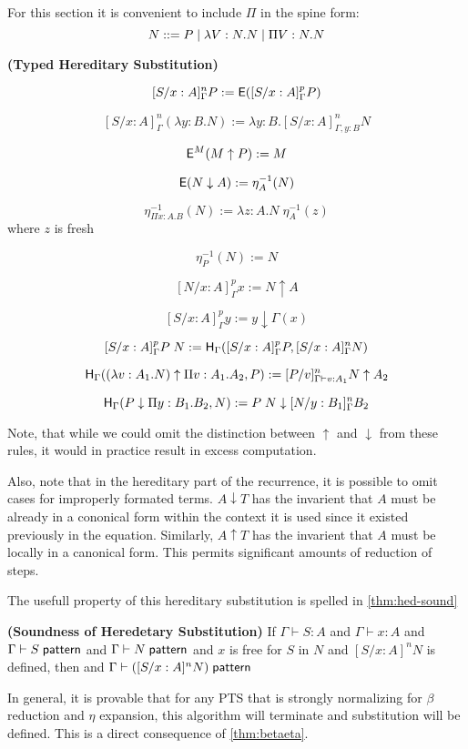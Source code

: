 For this section it is convenient to include $\Pi$ in the spine form: 
\[
N ::= P 
\; | \; \lambda V : N . N 
\; | \; \Pi V : N . N 
\]


\begin{definition}
\textbf{(Typed Hereditary Substitution)}

\[
[S / x : A]^n_{\Gamma } P := \mathsf{E}([S / x : A]^p_{\Gamma } P)
\]

\[
[S / x : A]^n_{\Gamma } (\lambda y : B . N) := \lambda y:B . [S / x : A]^n_{\Gamma, y : B} N
\]

\[
\mathsf{E}^M(M \uparrow P) := M
\]

\[
\mathsf{E}(N \downarrow A) := \eta^{-1}_A (N)
\]

\[
\eta^{-1}_{\Pi x : A . B}(N) := \lambda z : A . N \; \eta^{-1}_A(z)
\] where $z$ is fresh

\[
\eta^{-1}_{P}(N) := N
\]

\[ 
[ N / x : A]^p_{\Gamma} x := N \uparrow A
\]

\[
[S / x : A]^p_{\Gamma} y := y \downarrow \Gamma(x)
\] 

\[
[S / x : A]^p_{\Gamma } P\;N := 
\mathsf{H}_{\Gamma} ( [S/x : A]^p_{\Gamma} P , [S/x : A]^n_{\Gamma} N) 
\]

\[
\mathsf{H}_{\Gamma} ((\lambda v : A_1 . N) \uparrow \Pi v : A_1 . A_2 , P) 
:= [P/v]^n_{\Gamma \vdash v : A_1} N \uparrow A_2
\]

\[
\mathsf{H}_{\Gamma}(P \downarrow \Pi y : B_1 . B_2 , N) := P\; N \downarrow [N/y : B_1]^n_{\Gamma}B_2
\]

\label{def:tyhered}
\end{definition} 

Note, that while we could omit the distinction between $\uparrow$ and $\downarrow$ from
these rules, it would in practice result in excess computation.

Also, note that in the hereditary part of the recurrence, 
it is possible to omit cases for improperly formated terms.  $A \downarrow T$ has the invarient that
$A$ must be already in a cononical form within the context it is used since it existed previously in the
equation.  Similarly, $A \uparrow T$ has the invarient that $A$ must be locally in a canonical form.
This permits significant amounts of reduction of steps.

The usefull property of this hereditary substitution is spelled in \ref{thm:hed-sound}

\begin{theorem}
\textbf{(Soundness of Heredetary Substitution)}
If  $\Gamma \vdash S : A$ 
and $\Gamma \vdash x : A$ 
and $\Gamma \vdash S \; \mathsf{pattern}$ 
and $\Gamma \vdash N \; \mathsf{pattern}$ 
and $x$ is free for $S$ in $N$
and $[S / x : A]^n N$ is defined, 
then
and $\Gamma \vdash ([S / x : A]^n N) \; \mathsf{pattern}$ 
\label{thm:hed-sound}
\end{theorem}

In general, it is provable that for any PTS that is strongly normalizing for $\beta$ reduction and 
$\eta$ expansion, this algorithm will terminate and substitution will be defined.  
This is a direct consequence of \ref{thm:betaeta}.
